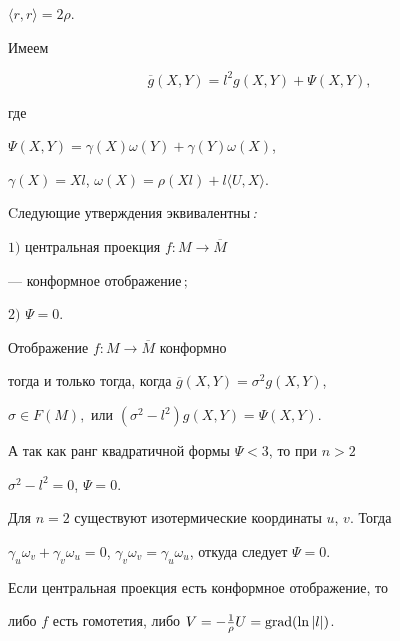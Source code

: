 $\langle r,r\rangle=2\rho .$


Имеем


\begin{equation}


\overline{g}(X,Y)= l^{2}g(X,Y) +\Psi(X,Y),


\end{equation}


где


$\Psi(X,Y)=\gamma (X)\omega(Y)+\gamma(Y)\omega(X)$,


$\gamma(X)=Xl$, $\omega(X)=\rho(Xl)+l\langle U,X\rangle.$





\begin{lem}


Cледующие утверждения эквивалентны\,{\em :}





$1)$ центральная проекция $f: M \rightarrow \overline{M}$


--- конформное отображение\,$;$





$2)$ $\Psi =0$.


\end{lem}





\begin{pf} Отображение $f: M \rightarrow \overline{M}$ конформно


тогда и только тогда, когда $\overline{g}(X,Y)= \sigma^{2}g(X,Y)$,


$\sigma \in F(M),$ или $(\sigma^2 -l^2 )g(X,Y)= \Psi(X,Y)$.


А так как ранг квадратичной формы $\Psi <3 $, то при $n>2$\;


$\sigma^2 -l^2 =0$, $\Psi =0$.


Для $n=2$ существуют изотермические координаты $u$, $v$. Тогда


$\gamma_{u}\omega_{v}+\gamma_{v}\omega_{u}=0$, $\gamma_{v}\omega_{v}=


\gamma_{u}\omega_{u}$, откуда следует $\Psi =0$.


\end{pf}





\begin{cor}                   


Если  центральная проекция есть конформное отображение, то


либо $f$ есть гомотетия, либо $V = -\frac{1}{\rho}U = \operatorname{grad}(\ln|l|)$.


\end{cor}





